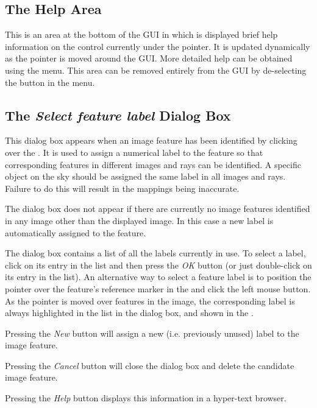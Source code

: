 \subsection {The Help Area}
This is an area at the bottom of the GUI in which is displayed brief help
information on the control currently under the pointer. It is updated
dynamically as the pointer is moved around the GUI. More detailed help
can be obtained using the  menu.
This area can be removed entirely from the GUI by de-selecting the
 button in the
 menu.

\subsection {The {\em Select feature label} Dialog Box}
This dialog box appears when an image feature has been identified by
clicking over the . It
is used to assign a numerical label to the feature so that corresponding
features in different images and rays can be identified. A specific object
on the sky should be assigned the same label in all images and rays.
Failure to do this will result in the mappings being inaccurate. 

The dialog box does not appear if there are currently no image features
identified in any image other than the displayed image. In this case a
new label is automatically assigned to the feature.

The dialog box contains a list of all the labels currently in use. To
select a label, click on its entry in the list and then press the {\em
OK} button (or just double-click on its entry in the list). An
alternative way to select a feature label is to position the pointer over
the feature's reference marker in the  and click the left mouse button. As the
pointer is moved over features in the image, the corresponding label 
is always highlighted in the list in the dialog box, and shown in the
.

Pressing the {\em New} button will assign a new (i.e. previously unused)
label to the image feature.

Pressing the {\em Cancel} button will close the dialog box and delete the 
candidate image feature.

Pressing the {\em Help} button displays this information in a hyper-text
browser.

